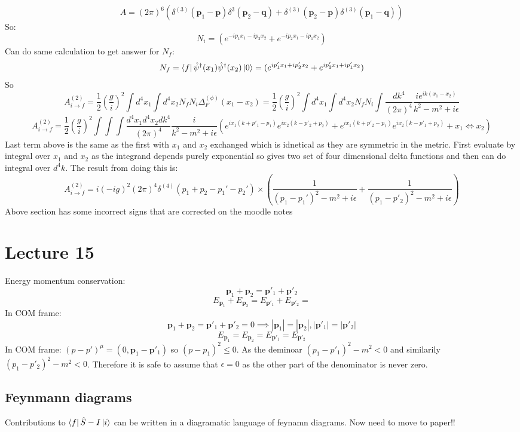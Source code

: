 \documentclass[12pt, a4paper, twoside, titlepage]{article}
\begin{document}
$$
A = (2\pi)^6 (\delta^{(3)} (\bm p_1 - \bm p) \delta^{3}(\bm p_2 - \bm q) + \delta^{(3)}(\bm p_2 - \bm p) \delta^{(3)}(\bm p_1 - \bm q))
$$
So:
$$
N_i = (e^{-i p_1x_1 - i p_2x_2} + e^{- i p_2 x_1 - i p_1 x_2})$$
Can do same calculation to get answer for $N_f$:
$$
N_f = \bra{f} \hat \psi^{\dagger}(x_1) \hat \psi^{\dagger}(x_2) \ket{0} = (e^{i p_1' x_1 + i p_2' x_2} + e^{i p'_2 x_1 + i p'_1 x_2})
$$
So
$$
A^{(2)}_{i \rightarrow f} = \frac{1}{2} (\frac{g}{i})^2 \int d^4 x_1 \int d^4 x_2 N_f N_i \Delta^{(\phi)}_F(x_1-x_2) =  \frac{1}{2} (\frac{g}{i})^2 \int d^4 x_1 \int d^4 x_2 N_f N_i \int \frac{dk^4}{(2\pi)^4} \frac{i e^{ik(x_1-x_2)}}{k^2 - m^2 + i \epsilon}
$$
$$
A^{(2)}_{i \rightarrow f} = \frac{1}{2} (\frac{g}{i})^2 \int \int \int \frac{d^4 x_1 d^4 x_2 dk^4}{(2\pi)^4} \frac{i }{k^2 - m^2 + i \epsilon} (e^{ix_1( k + p'_1 - p_1)} e^{ix_2(k-p'_2+p_2)} +e^{ix_1(k + p'_2 - p_1)}e^{ix_2(k-p'_1 + p_2)} + x_1 \iff x_2)
$$
Last term above is the same as the first with $x_1$ and $x_2$ exchanged which is idnetical as they are symmetric in the metric. First evaluate by integral over $x_1$ and $x_2$ as the integrand depends purely exponential so gives two set of four dimensional delta functions and then can do integral over $d^4 k$. The result from doing this is:
$$
A_{i \rightarrow f}^{(2)} = i(-ig)^2 (2 \pi)^4 \delta^{(4)}(p_1 + p_2 - p_1' - p_2')\times (\frac{1}{(p_1 - p_1')^2 - m^2 + i \epsilon} + \frac{1}{(p_1 - p'_2)^2 - m^2 + i \epsilon})
$$
Above section has some incorrect signs that are corrected on the moodle notes
\section{Lecture 15}
Energy momentum conservation:
$$
\bm p_1 + \bm p_2 = \bm p'_1 + \bm p'_2
$$
$$
E_{\bm p_1} + E_{\bm p_2} = E_{\bm p'_1} + E_{\bm p'_2} =
$$
In COM frame:
$$
\bm p_1 + \bm p_2 = \bm p'_1 + \bm p'_2 =0 \implies |\bm p_1| = |\bm p_2|, |\bm p'_1| = |\bm p'_2|
$$
$$
E_{\bm p_1} = E_{\bm p_2} = E_{\bm p'_1} = E_{\bm p'_2}
$$
In COM frame: $(p- p')^{\mu} = (0, \bm p_1 - \bm p'_1)$ so $(p- p_1)^2 \leq 0$. As the deminoar $(p_1 - p'_1)^2 -m^2 < 0$ and similarily $(p_1-p'_2)^2-m^2< 0$. Therefore it is safe to assume that $\epsilon=0$ as the other part of the denominator is never zero.
\subsection{Feynmann diagrams}
Contributions to $\bra{f} \hat S - I \ket{i}$ can be written in a diagramatic language of feynamn diagrams. Now need to move to paper!!
\end{document}
